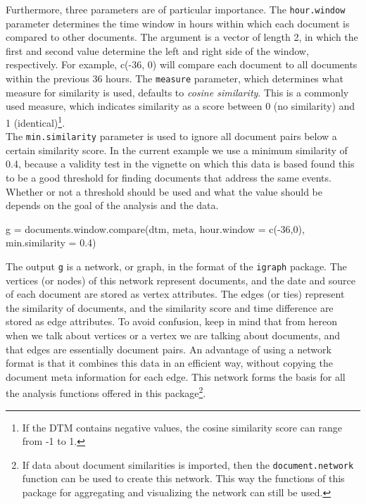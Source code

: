 Furthermore, three parameters are of particular importance. The
\texttt{hour.window} parameter determines the time window in hours
within which each document is compared to other documents. The argument
is a vector of length 2, in which the first and second value determine
the left and right side of the window, respectively. For example, c(-36,
0) will compare each document to all documents within the previous 36
hours. The \texttt{measure} parameter, which determines what measure for
similarity is used, defaults to \emph{cosine similarity}. This is a
commonly used measure, which indicates similarity as a score between 0
(no similarity) and 1 (identical)\footnote{If the DTM contains negative
  values, the cosine similarity score can range from -1 to 1.}.\\The
\texttt{min.similarity} parameter is used to ignore all document pairs
below a certain similarity score. In the current example we use a
minimum similarity of 0.4, because a validity test in the vignette on
which this data is based found this to be a good threshold for finding
documents that address the same events. Whether or not a threshold
should be used and what the value should be depends on the goal of the
analysis and the data.

\begin{Schunk}
\begin{Sinput}
g = documents.window.compare(dtm, meta,
                             hour.window = c(-36,0), 
                             min.similarity = 0.4)
\end{Sinput}
\end{Schunk}

The output \texttt{g} is a network, or graph, in the format of the
\texttt{igraph} package. The vertices (or nodes) of this network
represent documents, and the date and source of each document are stored
as vertex attributes. The edges (or ties) represent the similarity of
documents, and the similarity score and time difference are stored as
edge attributes. To avoid confusion, keep in mind that from hereon when
we talk about vertices or a vertex we are talking about documents, and
that edges are essentially document pairs. An advantage of using a
network format is that it combines this data in an efficient way,
without copying the document meta information for each edge. This
network forms the basis for all the analysis functions offered in this
package\footnote{If data about document similarities is imported, then
  the \texttt{document.network} function can be used to create this
  network. This way the functions of this package for aggregating and
  visualizing the network can still be used.}.

